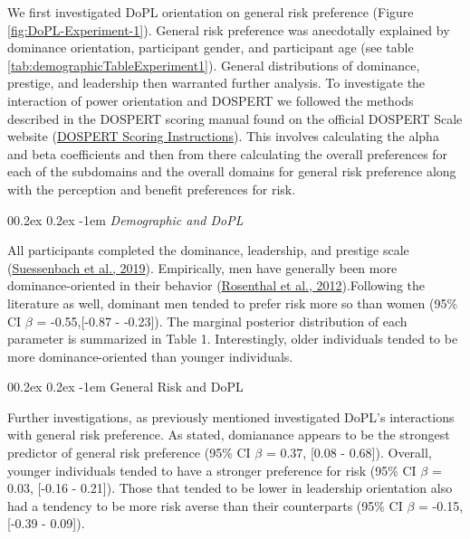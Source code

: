 \documentclass[
  donotrepeattitle,doc, 12pt, a4paper,floatsintext]{apa7}
\makeatletter
\let\oldparagraph\paragraph
\renewcommand{\paragraph}[1]{\oldparagraph{#1}\mbox{}}
\renewcommand{\paragraph}{\@startsection{paragraph}{4}{\parindent}%
  {0\baselineskip \@plus 0.2ex \@minus 0.2ex}%
  {-1em}%
  {\normalfont\normalsize\bfseries\itshape\typesectitle}}
\makeatother
\begin{document}
We first investigated DoPL orientation on general risk preference (Figure \ref{fig:DoPL-Experiment-1}). General risk preference was anecdotally explained by dominance orientation, participant gender, and participant age (see table \ref{tab:demographicTableExperiment1}). General distributions of dominance, prestige, and leadership then warranted further analysis. To investigate the interaction of power orientation and DOSPERT we followed the methods described in the DOSPERT scoring manual found on the official DOSPERT Scale website (\href{https://sites.google.com/a/decisionsciences.columbia.edu/dospert/scoring-instructions}{DOSPERT Scoring Instructions}). This involves calculating the alpha and beta coefficients and then from there calculating the overall preferences for each of the subdomains and the overall domains for general risk preference along with the perception and benefit preferences for risk.

\hypertarget{demographic-and-dopl}{%
\paragraph{\texorpdfstring{\emph{Demographic and DoPL}}{Demographic and DoPL}}\label{demographic-and-dopl}}

All participants completed the dominance, leadership, and prestige scale (\protect\hyperlink{ref-suessenbach2019}{Suessenbach et al., 2019}). Empirically, men have generally been more dominance-oriented in their behavior (\protect\hyperlink{ref-rosenthal2012}{Rosenthal et al., 2012}).Following the literature as well, dominant men tended to prefer risk more so than women (95\% CI \(\beta\) = -0.55,{[}-0.87 - -0.23{]}). The marginal posterior distribution of each parameter is summarized in Table 1. Interestingly, older individuals tended to be more dominance-oriented than younger individuals.

\hypertarget{general-risk-and-dopl}{%
\paragraph{General Risk and DoPL}\label{general-risk-and-dopl}}

Further investigations, as previously mentioned investigated DoPL's interactions with general risk preference. As stated, domianance appears to be the strongest predictor of general risk preference (95\% CI \(\beta\) = 0.37, {[}0.08 - 0.68{]}). Overall, younger individuals tended to have a stronger preference for risk (95\% CI \(\beta\) = 0.03, {[}-0.16 - 0.21{]}). Those that tended to be lower in leadership orientation also had a tendency to be more risk averse than their counterparts (95\% CI \(\beta\) = -0.15, {[}-0.39 - 0.09{]}).
\end{document}
